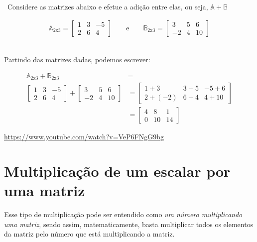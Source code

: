 \begin{example}
	\video \, Considere as matrizes abaixo e efetue a adição entre elas, ou seja, $\mathbb{A}+\mathbb{B}$
	
	\begin{ceqn}
		\begin{align*}
			\mathbb{A}_{2\mathrm{x}3}=\begin{bmatrix}1 & 3 & -5\\
		2 & 6 & 4
		\end{bmatrix}\qquad\mathrm{e}\qquad\mathbb{B}_{2\mathrm{x}3}=\begin{bmatrix}3 & 5 & 6\\
		-2 & 4 & 10
		\end{bmatrix}
		\end{align*}
	\end{ceqn}
\\

	Partindo das matrizes dadas, podemos escrever:


\begin{ceqn}
	\begin{align*}
		\mathbb{A}_{2\mathrm{x}3}+\mathbb{B}_{2\mathrm{x}3} & =\\
	\begin{bmatrix}1 & 3 & -5\\
	2 & 6 & 4
	\end{bmatrix}+\begin{bmatrix}3 & 5 & 6\\
	-2 & 4 & 10
	\end{bmatrix} & =  \begin{bmatrix}1+3 & 3+5 & -5+6\\
	2+(-2) & 6+4 & 4+10
	\end{bmatrix}\\
	& =  \begin{bmatrix}4 & 8 & 1\\
	0 & 10 & 14
	\end{bmatrix}
	\end{align*}
\end{ceqn}


\doutor \url{https://www.youtube.com/watch?v=VeP6FNgG9bg}
\end{example}

\section{Multiplicação de um escalar por uma matriz}

Esse tipo de multiplicação pode ser entendido como \textit{um número multiplicando uma matriz}, sendo assim, matematicamente, basta multiplicar todos os elementos da matriz pelo número que está multiplicando a matriz.

